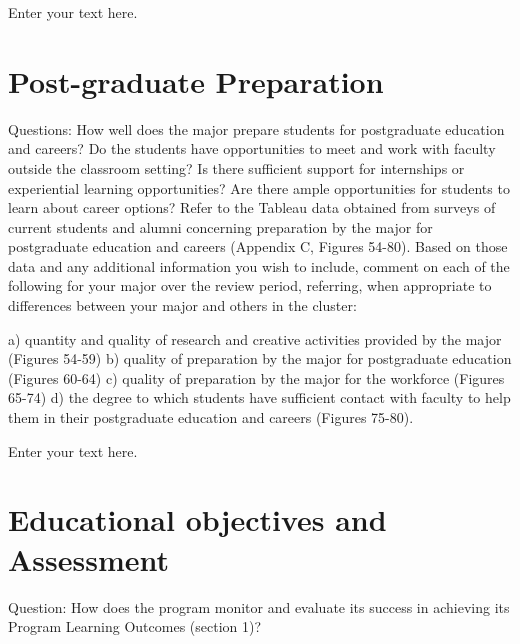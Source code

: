 \documentclass[12pt]{article}
\begin{document}
Enter your text here.

\section{Post-graduate Preparation}
Questions: How well does the major prepare students for postgraduate education and careers? Do the students have opportunities to meet and work with faculty outside the classroom setting? Is there sufficient support for internships or experiential learning opportunities? Are there ample opportunities for students to learn about career options?  
Refer to the Tableau data obtained from surveys of current students and alumni concerning preparation by the major for postgraduate education and careers (Appendix C, Figures 54-80). Based on those data and any additional information you wish to include, comment on each of the following for your major over the review period, referring, when appropriate to differences between your major and others in the cluster:

    a) quantity and quality of research and creative activities provided by the major (Figures 54-59)
    b) quality of preparation by the major for postgraduate education (Figures 60-64)
    c) quality of preparation by the major for the workforce (Figures 65-74)
    d) the degree to which students have sufficient contact with faculty to help them in their postgraduate education and careers (Figures 75-80).

Enter your text here.

\section{Educational objectives and Assessment}
Question: How does the program monitor and evaluate its success in achieving its Program  Learning Outcomes (section 1)?  
\end{document}
